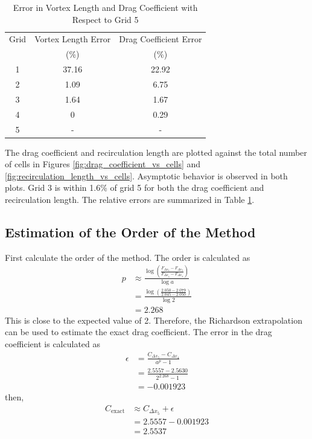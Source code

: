 \begin{table}[H]
    \centering
    \caption{Error in Vortex Length and Drag Coefficient with Respect to Grid 5}
    \label{tab:error_vortex_length_drag_coefficient}
    \begin{tabular}{ccc}
        \toprule
        Grid & Vortex Length Error & Drag Coefficient Error \\
        & (\%) & (\%) \\
        \midrule
        1 & 37.16 & 22.92 \\
        2 & 1.09 & 6.75 \\
        3 & 1.64 & 1.67 \\
        4 & 0 & 0.29 \\
        5 & - & - \\
        \bottomrule
    \end{tabular}
\end{table}
The drag coefficient and recirculation length are plotted against the total number of cells in Figures \ref{fig:drag_coefficient_vs_cells} and \ref{fig:recirculation_length_vs_cells}. Asymptotic behavior is observed in both plots. Grid 3 is within 1.6\% of grid 5 for both the drag coefficient and recirculation length. The relative errors are summarized in Table \ref{tab:error_vortex_length_drag_coefficient}. 

\subsection{Estimation of the Order of the Method}
First calculate the order of the method. The order is calculated as
\begin{align*}
    p &\approx \frac{\log\left(\frac{F_{\Delta x_4} - F_{\Delta x_3}}{F_{\Delta x_5} - F_{\Delta x_4}}\right)}{\log a } \\
    &= \frac{\log\left(\frac{2.050 - 2.079}{2.045 - 2.050}\right)}{\log 2} \\
    &= \boxed{2.268}
\end{align*}
This is close to the expected value of 2. Therefore, the Richardson extrapolation can be used to estimate the exact drag coefficient. The error in the drag coefficient is calculated as
\begin{align*}
    \epsilon &= \frac{C_{\Delta x_5} - C_{\Delta x_4}}{a^p - 1} \\
    &= \frac{2.5557 - 2.5630}{2^{2.268} - 1} \\
    &= -0.001923
\end{align*}
then,
\begin{align*}
    C_{\text{exact}} &\approx C_{\Delta x_5} + \epsilon \\
    &= 2.5557 - 0.001923 \\
    &= \boxed{2.5537}
\end{align*}

